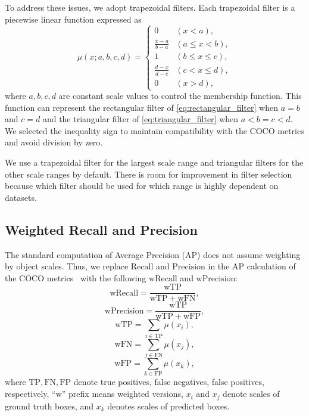\documentclass{mva_style}
\newcommand{\TP}{\mathrm{TP}}
\newcommand{\FP}{\mathrm{FP}}
\newcommand{\FN}{\mathrm{FN}}
\newcommand{\wTP}{\mathrm{wTP}}
\newcommand{\wFP}{\mathrm{wFP}}
\newcommand{\wFN}{\mathrm{wFN}}
\newcommand{\Recall}{\mathrm{Recall}}
\newcommand{\Precision}{\mathrm{Precision}}
\newcommand{\wRecall}{\mathrm{wRecall}}
\newcommand{\wPrecision}{\mathrm{wPrecision}}
\begin{document}
To address these issues, we adopt trapezoidal filters.
Each trapezoidal filter is a piecewise linear function expressed as
\begin{equation} \label{eq:trapezoidal_filter}
	\mu(x; a, b, c, d) =
	\begin{cases}
		0                   & (x < a),           \\
		\frac{x - a}{b - a} & (a \leq x < b),    \\
		1                   & (b \leq x \leq c), \\
		\frac{d - x}{d - c} & (c < x \leq d),    \\
		0                   & (x > d),
	\end{cases}
\end{equation}
where $a, b, c, d$ are constant scale values to control the membership function.
This function can represent the rectangular filter of \cref{eq:rectangular_filter} when $a = b$ and $c = d$ and the triangular filter of \cref{eq:triangular_filter} when $a < b = c < d$.
We selected the inequality sign to maintain compatibility with the COCO metrics and avoid division by zero.

We use a trapezoidal filter for the largest scale range and triangular filters for the other scale ranges by default.
There is room for improvement in filter selection because which filter should be used for which range is highly dependent on datasets.




\subsection{Weighted Recall and Precision}

The standard computation of Average Precision (AP) does not assume weighting by object scales.
Thus, we replace $\Recall$ and $\Precision$ in the AP calculation of the COCO metrics~\cite{cocoapi} with the following $\wRecall$ and $\wPrecision$:
\begin{equation}
	\wRecall = \frac{\wTP}{\wTP + \wFN},
\end{equation}
\begin{equation}
	\wPrecision = \frac{\wTP}{\wTP + \wFP},
\end{equation}
\begin{equation}
	\wTP = \sum_{i \in \TP} \mu(x_i),
\end{equation}
\begin{equation}
	\wFN = \sum_{j \in \FN} \mu(x_j),
\end{equation}
\begin{equation}
	\wFP = \sum_{k \in \FP} \mu(x_k),
\end{equation}
where $\TP, \FN, \FP$ denote true positives, false negatives, false positives, respectively,
``$\mathrm{w}$'' prefix means weighted versions,
$x_i$ and $x_j$ denote scales of ground truth boxes,
and $x_k$ denotes scales of predicted boxes.
\end{document}
